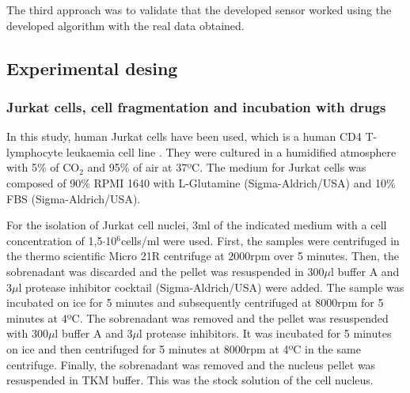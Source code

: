 \documentclass[12pt, a4paper]{article} %
\begin{document}
	The third approach was to validate that the developed sensor worked using the developed algorithm with the real data obtained. 
	
	\setlength{\parskip}{0mm}
	
	\subsection{Experimental desing}
	
	\subsubsection{Jurkat cells, cell fragmentation and incubation with drugs}
	
	In this study, human Jurkat cells have been used,  which is a human CD4 T-lymphocyte leukaemia cell line \cite{schneider1977characterization}. They were cultured in a humidified atmosphere with 5\% of CO$_{2}$ and 95\% of air at 37ºC. The medium for Jurkat cells was composed of 90\% RPMI 1640 with L-Glutamine (Sigma-Aldrich/USA) and 10\% FBS (Sigma-Aldrich/USA).
	
	\setlength{\parskip}{4mm}
	
	For the isolation of Jurkat cell nuclei, 3ml of the indicated medium with a cell concentration of 1,5$\cdot$10$^6$cells/ml were used. First, the samples were centrifuged in the thermo scientific Micro 21R centrifuge at 2000rpm over 5 minutes. Then, the sobrenadant was discarded and the pellet was resuspended in 300$\mu$l buffer A and 3$\mu$l protease inhibitor cocktail (Sigma-Aldrich/USA) were added. The sample was incubated on ice for 5 minutes and subsequently centrifuged at 8000rpm for 5 minutes at 4ºC. The sobrenadant was removed and the pellet was resuspended with 300$\mu$l buffer A and 3$\mu$l protease inhibitors. It was incubated for 5 minutes on ice and then centrifuged for 5 minutes at 8000rpm at 4ºC in the same centrifuge. Finally, the sobrenadant was removed and the nucleus pellet was resuspended in TKM buffer. This was the stock solution of the cell nucleus.
	
\end{document}
